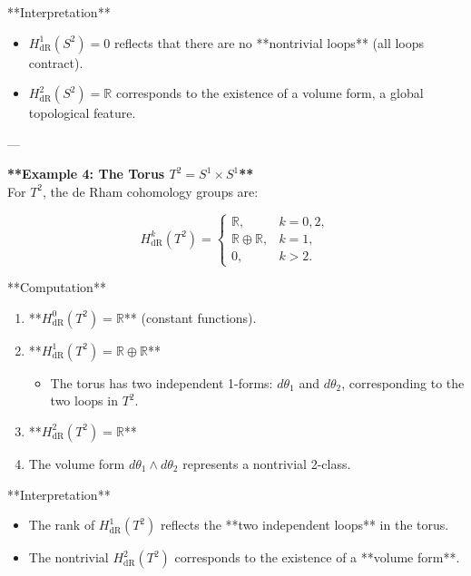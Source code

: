 \documentclass[10pt,a4paper]{report}
\begin{document}
\begin{description}
\begin{enumerate}
\begin{itemize}
\end{itemize}
   
 \end{enumerate}

 **Interpretation**
\begin{itemize}
\item  \( H^1_{\text{dR}}(S^2) = 0 \) reflects that there are no **nontrivial loops** (all loops contract).
\item  \( H^2_{\text{dR}}(S^2) = \mathbb{R} \) corresponds to the existence of a volume form, a global topological feature.

\end{itemize}

---

\item \textbf{**Example 4: The Torus \( T^2 = S^1 \times S^1 \)**}  \\
For \( T^2 \), the de Rham cohomology groups are:

\[
H^k_{\text{dR}}(T^2) =
\begin{cases}
\mathbb{R}, & k = 0,2, \\
\mathbb{R} \oplus \mathbb{R}, & k = 1, \\
0, & k > 2.
\end{cases}
\]

 **Computation**\\
 
 \begin{enumerate}
 
\item  **\( H^0_{\text{dR}}(T^2) = \mathbb{R} \)** (constant functions).  \\
\item  **\( H^1_{\text{dR}}(T^2) = \mathbb{R} \oplus \mathbb{R} \)**  
\begin{itemize}
   \item  The torus has two independent 1-forms: \( d\theta_1 \) and \( d\theta_2 \), corresponding to the two loops in \( T^2 \).\\

\end{itemize}
\item  **\( H^2_{\text{dR}}(T^2) = \mathbb{R} \)**  
   \item The volume form \( d\theta_1 \wedge d\theta_2 \) represents a nontrivial 2-class.\\

 \end{enumerate}


 **Interpretation**\\
 \begin{itemize}
 
\item The rank of \( H^1_{\text{dR}}(T^2) \) reflects the **two independent loops** in the torus.\\
\item  The nontrivial \( H^2_{\text{dR}}(T^2) \) corresponds to the existence of a **volume form**.\\

 \end{itemize}

\end{description}
\end{document}
